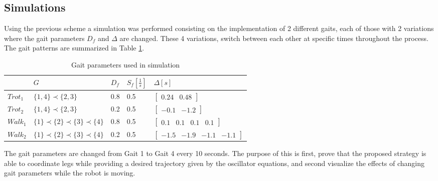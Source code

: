 \documentclass[main.tex]{subfiles}
\begin{document}
\subsection{Simulations}
Using the previous scheme a simulation was performed consisting on the implementation of 2 different gaits, each of those with 2 variations where the gait parameters $D_f$ and $\Delta$ are changed. These 4 variations, switch between each other at specific times throughout the process. The gait patterns are summarized in Table \ref{Table:GaitParameters}.
\begin{table}[b]
\centering
\caption{Gait parameters used in simulation}
\label{Table:GaitParameters}
\begin{tabular}{|l|l|l|l|l|}
\hline
       & $G$                                   & $D_f$ & $S_f[\frac{1}{s}]$ & $\Delta[s]$                                                 \\ \hline
$Trot_1$ & $\{1,4\}\prec\{2,3\}$                 & 0.8  & 0.5        & $\begin{bmatrix} 0.24 & 0.48\end{bmatrix}$               \\ \hline
$Trot_2$ & $\{1,4\}\prec\{2,3\}$                 & 0.2  & 0.5        & $\begin{bmatrix} -0.1 &-1.2\end{bmatrix}$                \\ \hline
$Walk_1$ & $\{1\}\prec\{2\}\prec\{3\}\prec\{4\}$ & 0.8  & 0.5        & $\begin{bmatrix} 0.1 & 0.1 & 0.1 & 0.1\end{bmatrix}$     \\ \hline
$Walk_2$ & $\{1\}\prec\{2\}\prec\{3\}\prec\{4\}$ & 0.2  & 0.5        & $\begin{bmatrix} -1.5 & -1.9 & -1.1 & -1.1\end{bmatrix}$ \\ \hline
\end{tabular}
\end{table}
The gait parameters are changed from Gait 1 to Gait 4 every 10 seconds. The purpose of this is first, prove that the proposed strategy is able to coordinate legs while providing a desired trajectory given by the oscillator equations, and second visualize the effects of changing gait parameters while the robot is moving. 
\end{document}
